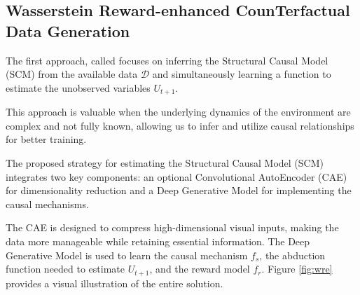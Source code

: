 \subsection{Wasserstein Reward-enhanced CounTerfactual\\ Data Generation}
\label{sec:wre}

The first approach, called  focuses on inferring the Structural Causal Model
(SCM) from the available data \( \mathcal{D} \) and simultaneously learning
a function to estimate the unobserved variables $U_{t+1}$.

This approach is valuable when the underlying dynamics of the
environment are complex and not fully known, allowing us to
infer and utilize causal relationships for better training.

The proposed strategy for estimating the Structural Causal Model (SCM)
integrates two key components: an optional Convolutional AutoEncoder (CAE)
for dimensionality reduction and a Deep Generative Model for
implementing the causal mechanisms.

The CAE is designed to compress high-dimensional visual inputs,
making the data more manageable while retaining essential information.
The Deep Generative Model is used to learn the causal mechanism \( f_s \),
the abduction function needed to estimate \( U_{t+1} \),
and the reward model \( f_r \).
Figure \ref{fig:wre} provides a visual illustration of the entire solution.

